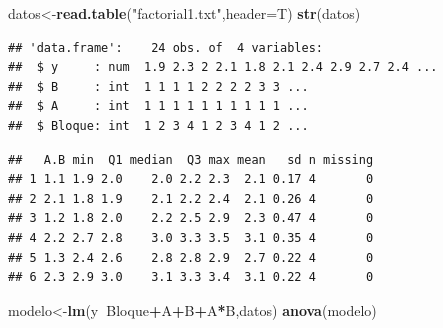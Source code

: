 \documentclass[]{book}
\newenvironment{Shaded}{\begin{snugshade}}{\end{snugshade}}
\newcommand{\KeywordTok}[1]{\textcolor[rgb]{0.13,0.29,0.53}{\textbf{#1}}}
\newcommand{\DataTypeTok}[1]{\textcolor[rgb]{0.13,0.29,0.53}{#1}}
\newcommand{\StringTok}[1]{\textcolor[rgb]{0.31,0.60,0.02}{#1}}
\newcommand{\OperatorTok}[1]{\textcolor[rgb]{0.81,0.36,0.00}{\textbf{#1}}}
\newcommand{\NormalTok}[1]{#1}
\begin{document}
\begin{Shaded}
\begin{Highlighting}[]
\NormalTok{datos<-}\KeywordTok{read.table}\NormalTok{(}\StringTok{"factorial1.txt"}\NormalTok{,}\DataTypeTok{header=}\NormalTok{T)}
\KeywordTok{str}\NormalTok{(datos)}
\end{Highlighting}
\end{Shaded}

\begin{verbatim}
## 'data.frame':    24 obs. of  4 variables:
##  $ y     : num  1.9 2.3 2 2.1 1.8 2.1 2.4 2.9 2.7 2.4 ...
##  $ B     : int  1 1 1 1 2 2 2 2 3 3 ...
##  $ A     : int  1 1 1 1 1 1 1 1 1 1 ...
##  $ Bloque: int  1 2 3 4 1 2 3 4 1 2 ...
\end{verbatim}

\begin{Shaded}
\end{Shaded}

\begin{verbatim}
##   A.B min  Q1 median  Q3 max mean   sd n missing
## 1 1.1 1.9 2.0    2.0 2.2 2.3  2.1 0.17 4       0
## 2 2.1 1.8 1.9    2.1 2.2 2.4  2.1 0.26 4       0
## 3 1.2 1.8 2.0    2.2 2.5 2.9  2.3 0.47 4       0
## 4 2.2 2.7 2.8    3.0 3.3 3.5  3.1 0.35 4       0
## 5 1.3 2.4 2.6    2.8 2.8 2.9  2.7 0.22 4       0
## 6 2.3 2.9 3.0    3.1 3.3 3.4  3.1 0.22 4       0
\end{verbatim}

\begin{Shaded}
\begin{Highlighting}[]
\NormalTok{modelo<-}\KeywordTok{lm}\NormalTok{(y}\OperatorTok{~}\NormalTok{Bloque}\OperatorTok{+}\NormalTok{A}\OperatorTok{+}\NormalTok{B}\OperatorTok{+}\NormalTok{A}\OperatorTok{*}\NormalTok{B,datos)}
\KeywordTok{anova}\NormalTok{(modelo)}
\end{Highlighting}
\end{Shaded}
\end{document}
